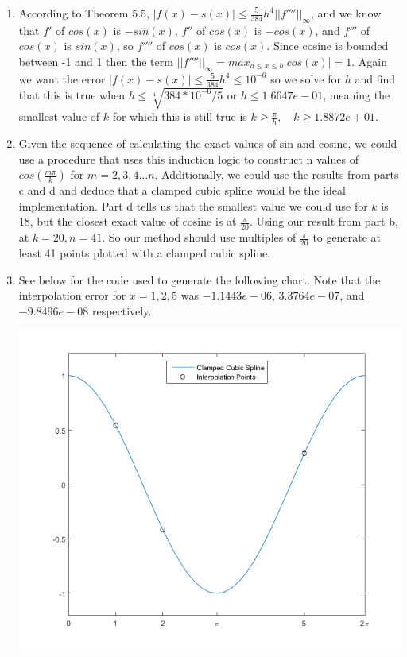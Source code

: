 \documentclass[11pt,a4paper]{article}
\begin{document}
\begin{itemize}
\begin{enumerate} [label={\alph*)}]
					\item According to Theorem 5.5,  $\vert f(x)-s(x)\vert\leq \frac{5}{384}h^4\vert\vert f''''\vert\vert_\infty$, and we know that $f'$ of $cos(x)$ is $-sin(x)$, $f''$ of $cos(x)$ is $-cos(x)$, and $f'''$ of $cos(x)$ is $sin(x)$, so $f''''$ of $cos(x)$ is $cos(x)$. Since cosine is bounded between -1 and 1 then the term $\vert\vert f'''' \vert\vert_\infty = max_{a \leq x \leq b}\vert cos(x) \vert = 1$. Again we want the error $\vert f(x)-s(x)\vert \leq \frac{5}{384}h^4 \leq 10^{-6}$ so we solve for $h$ and find that this is true when $h\leq \sqrt[4]{384*10^{-6}/5}$ or $h\leq 1.6647e-01$, meaning the smallest value of $k$ for which this is still true is $k\geq \frac{\pi}{h}, \quad k\geq 1.8872e+01$.
					\item Given the sequence of calculating the exact values of sin and cosine, we could use a procedure that uses this induction logic to construct n values of $cos(\frac{m\pi}{k})$ for $m=2,3,4\dots n$. Additionally, we could use the results from parts c and d and deduce that a clamped cubic spline would be the ideal implementation. Part d tells us that the smallest value we could use for $k$ is 18, but the closest exact value of cosine is at $\frac{\pi}{20}$. Using our result from part b, at $k=20, n=41$. So our method should use multiples of $\frac{\pi}{20}$ to generate at least 41 points plotted with a clamped cubic spline.
					\item See below for the code used to generate the following chart. Note that the interpolation error for $x=1,2,5$ was $-1.1443e-06$, $3.3764e-07$, and $-9.8496e-08$ respectively.
					\begin{center}
						\includegraphics[width=1\linewidth]{ch5q27}
					\end{center}
				\end{enumerate}
				

\end{itemize}
\end{document}
